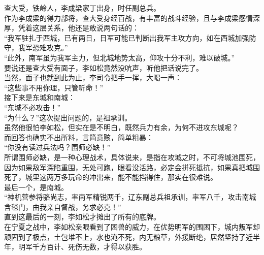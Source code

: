 \begin{multicols}{\theparacolNo}
查大受，铁岭人，李成梁家丁出身，时任副总兵。\\

作为李成梁的得力部将，查大受身经百战，有丰富的战斗经验，且与李成梁感情深厚，凭着这层关系，他还是敢说两句话的：\\

“我军驻扎于西城，已有两日，日军可能已判断出我军主攻方向，如在西城加强防守，我军恐难攻克。”\\

“此外，南军虽为我军主力，但北城地势太高，仰攻十分不利，难以破城。”\\

要说还是查大受有面子，李如松竟然没吭声，听他把话说完了。\\

当然，面子也就到此为止，李司令把手一挥，大喝一声：\\

“这些事不用你理，只管听命！”\\

接下来是东城和南城：\\

“东城不必攻击！”\\

“为什么？”这次提出问题的，是祖承训。\\

虽然他很怕李如松，但实在是不明白，既然兵力有余，为何不进攻东城呢？\\

而回答也确实不出所料，言简意赅，简单粗暴：\\

“你没有读过兵法吗？围师必缺！”\\

所谓围师必缺，是一种心理战术，具体说来，是指在攻城之时，不可将城池围死，因为如果敌军深陷重围，无处可跑，眼看没活路，必定会拼死抵抗，如果真把城围死了，城里这两万多玩命的冲出来，能不能挡得住，那实在很难说。\\

最后一个，是南城。\\

“神机营参将骆尚志，率南军精锐两千，辽东副总兵祖承训，率军八千，攻击南城含毯门，由我亲自督战，务求必克！”\\

直到这最后的一刻，李如松才摊出了所有的底牌。\\

在宁夏之战中，李如松亲眼看到了困兽的威力，在优势明军的围困下，城内叛军却顽固到了极点，土包堆不上，水也淹不死，内无粮草，外援断绝，居然坚持了近半年，明军千方百计、死伤无数，才得以获胜。\\


\end{multicols}
